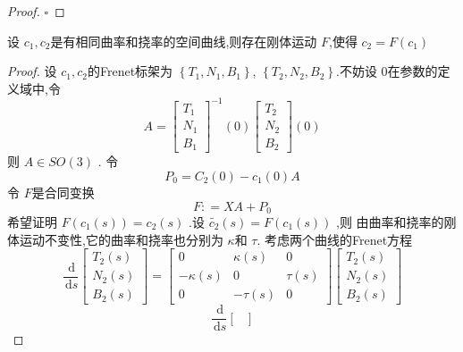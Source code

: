 \documentclass[../../古典微分几何.tex]{subfiles}
\begin{document}
\begin{proof}
    \hfill $\square$
\end{proof}

\begin{definition}
    设 \(  c_1,c_2  \)是有相同曲率和挠率的空间曲线,则存在刚体运动 \(  F  \),使得 \(  c_2= F\left( c_1 \right)   \)   
\end{definition}

\begin{proof}
        设 \(  c_1,c_2  \)的Frenet标架为 \(  \left\{ T_1,N_1,B_1 \right\}  \), \(  \left\{ T_2,N_2,B_2 \right\}  \).不妨设
         \(  0  \)在参数的定义域中,令 \[
         A =  \begin{bmatrix} 
             T_1\\ 
              N_1\\ 
               B_1 
         \end{bmatrix}^{-1} \left( 0 \right)  \begin{bmatrix} 
             T_2\\ 
              N_2\\ 
               B_2 
         \end{bmatrix} \left( 0 \right)  
         \]    则  \(  A \in SO\left( 3 \right)   \)  .
         令 \[
         P_0= C_2\left( 0 \right)-c_1\left( 0 \right)A  
         \]令 \(  F  \)是合同变换 \[
         F : =  XA+ P_0
         \] 希望证明 \(  F\left( c_1\left( s \right)  \right)= c_2\left( s \right)    \) .设 \(  \tilde{c_2}\left( s \right)=  F\left( c_1\left( s \right)  \right)    \) ,则 由曲率和挠率的刚体运动不变性,它的曲率和挠率也分别为 \(   \kappa   \)和 \(  \tau   \).  
考虑两个曲线的Frenet方程 \[
\frac{\,\mathrm{d}  }{\,\mathrm{d} s }\begin{bmatrix} 
    T_2\left( s \right)\\ 
     N_2\left( s \right)\\ 
      B_2\left( s \right)    
\end{bmatrix} =  \begin{bmatrix} 
    0&  \kappa \left( s \right)&0\\ 
     - \kappa \left( s \right)&0&\tau \left( s \right)\\ 
      0&-\tau \left( s \right)&0     
\end{bmatrix} \begin{bmatrix} 
    T_2\left( s \right)\\ 
     N_2\left( s \right)\\ 
      B_2\left( s \right)    
\end{bmatrix}    
\]
\[
    \frac{\,\mathrm{d}  }{\,\mathrm{d} s }\begin{bmatrix} 

\end{bmatrix}\]
\end{proof}
\end{document}

